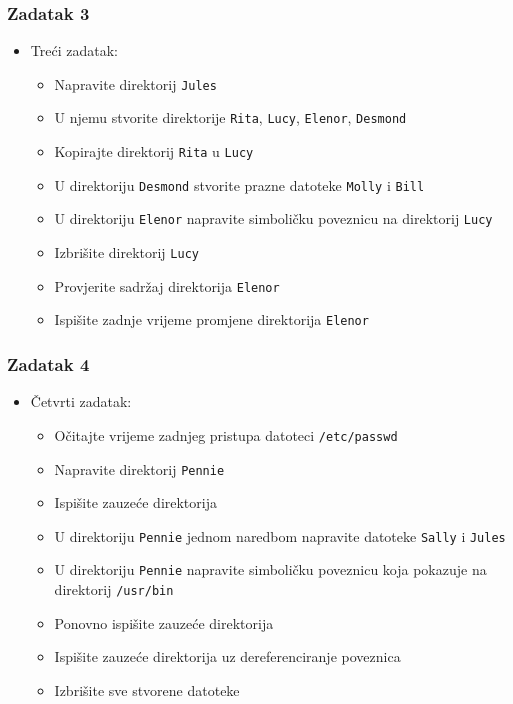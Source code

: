 \documentclass{beamer}
\newcommand{\shell}[1]{\texttt{#1}}
\begin{document}
\begin{frame}[t]
\frametitle{Zadatak 3}
\begin{itemize}
	\item Treći zadatak:
	\begin{itemize}
		\item Napravite direktorij \shell{Jules}
		\item U njemu stvorite direktorije \shell{Rita}, \shell{Lucy}, \shell{Elenor}, \shell{Desmond}
		\item Kopirajte direktorij \shell{Rita} u \shell{Lucy}
		\item U direktoriju \shell{Desmond} stvorite prazne datoteke \shell{Molly} i \shell{Bill}
		\item U direktoriju \shell{Elenor} napravite simboličku poveznicu na direktorij \shell{Lucy} 
		\item Izbrišite direktorij \shell{Lucy}
		\item Provjerite sadržaj direktorija \shell{Elenor}
		\item Ispišite zadnje vrijeme promjene direktorija \shell{Elenor}
	\end{itemize}
\end{itemize}
\end{frame}

\begin{frame}[t]
\frametitle{Zadatak 4}
\begin{itemize}
	\item Četvrti zadatak:
	\begin{itemize}
		\item Očitajte vrijeme zadnjeg pristupa datoteci \shell{/etc/passwd}
		\item Napravite direktorij \shell{Pennie}
		\item Ispišite zauzeće direktorija
		\item U direktoriju \shell{Pennie} jednom naredbom napravite datoteke \shell{Sally} i \shell{Jules}
		\item U direktoriju \shell{Pennie} napravite simboličku poveznicu koja pokazuje na direktorij \shell{/usr/bin}
		\item Ponovno ispišite zauzeće direktorija
		\item Ispišite zauzeće direktorija uz dereferenciranje poveznica
		\item Izbrišite sve stvorene datoteke
	\end{itemize}
\end{itemize}
\end{frame}
\end{document}
